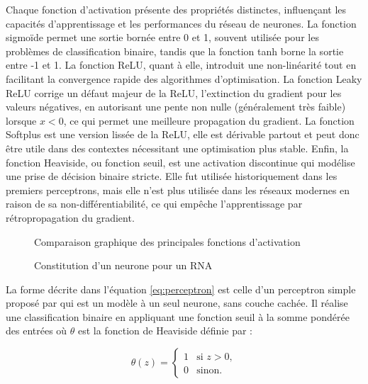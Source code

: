 Chaque fonction d’activation présente des propriétés distinctes, influençant les capacités d'apprentissage et les performances du réseau de neurones. La fonction sigmoïde permet une sortie bornée entre 0 et 1, souvent utilisée pour les problèmes de classification binaire, tandis que la fonction tanh borne la sortie entre -1 et 1. La fonction ReLU, quant à elle, introduit une non-linéarité tout en facilitant la convergence rapide des algorithmes d’optimisation. La fonction Leaky ReLU corrige un défaut majeur de la ReLU, l’extinction du gradient pour les valeurs négatives, en autorisant une pente non nulle (généralement très faible) lorsque $x <0$, ce qui permet une meilleure propagation du gradient. La fonction Softplus est une version lissée de la ReLU, elle est dérivable partout et peut donc être utile dans des contextes nécessitant une optimisation plus stable. Enfin, la fonction Heaviside, ou fonction seuil, est une activation discontinue qui modélise une prise de décision binaire stricte. Elle fut utilisée historiquement dans les premiers perceptrons, mais elle n’est plus utilisée dans les réseaux modernes en raison de sa non-différentiabilité, ce qui empêche l’apprentissage par rétropropagation du gradient.

\begin{figure}[H]
    \centering
    
    \caption{Comparaison graphique des principales fonctions d’activation}
    \label{fig:enter-label}
\end{figure}

\begin{figure}[H]
    \centering
    
    \caption{Constitution d'un neurone pour un RNA}
    \label{fig:enter-label}
\end{figure}

La forme décrite dans l'équation \eqref{eq:perceptron} est celle d'un perceptron simple proposé par \citep{rosenblatt1957perceptron} qui est un modèle à un seul neurone, sans couche cachée. Il réalise une classification binaire en appliquant une fonction seuil à la somme pondérée des entrées où \( \theta \) est la fonction de Heaviside définie par :

\begin{equation}
\theta(z) = 
\begin{cases}
1 & \text{si } z > 0, \\
0 & \text{sinon}.
\end{cases}
\end{equation}

